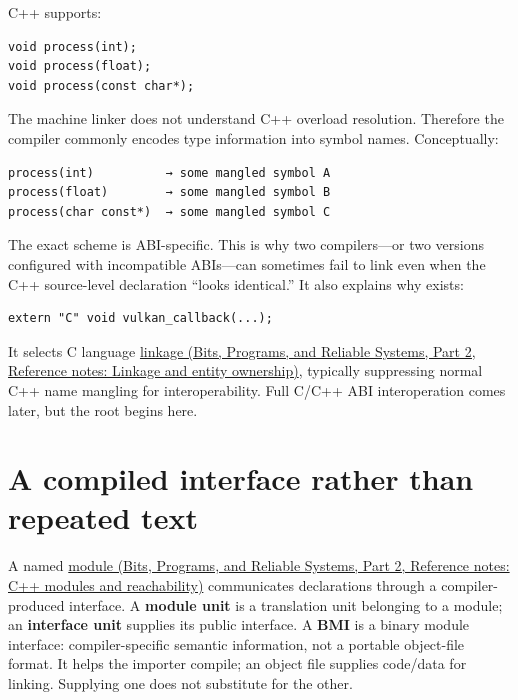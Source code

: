 C++ supports:

\begin{verbatim}
void process(int);
void process(float);
void process(const char*);
\end{verbatim}

The machine linker does not understand C++ overload resolution. Therefore the compiler commonly encodes type information into symbol names. Conceptually:

\begin{verbatim}
process(int)          → some mangled symbol A
process(float)        → some mangled symbol B
process(char const*)  → some mangled symbol C
\end{verbatim}

The exact scheme is ABI-specific. This is why two compilers---or two versions configured with incompatible ABIs---can sometimes fail to link even when the C++ source-level declaration ``looks identical.'' It also explains why  exists:

\begin{verbatim}
extern "C" void vulkan_callback(...);
\end{verbatim}

It selects C language \href{../01-Bits-Programs-and-Reliable-Systems-P02/main.pdf\#nameddest=appendix-74a0ec818c18}{linkage (Bits, Programs, and Reliable Systems, Part 2, Reference notes: Linkage and entity ownership)}, typically suppressing normal C++ name mangling for interoperability. Full C/C++ ABI interoperation comes later, but the root begins here.

\section{A compiled interface rather than repeated text}\label{05-engine-i-ch002-a-compiled-interface-rather-than-repeated-text}

\hypertarget{05-engine-i-ch002-a-compiled-interface-rather-than-repeated-text}{}

A named \href{../01-Bits-Programs-and-Reliable-Systems-P02/main.pdf\#nameddest=appendix-410a611a5b8d}{module (Bits, Programs, and Reliable Systems, Part 2, Reference notes: C++ modules and reachability)} communicates declarations through a compiler-produced interface. A \textbf{module unit} is a translation unit belonging to a module; an \textbf{interface unit} supplies its public interface. A \textbf{BMI} is a binary module interface: compiler-specific semantic information, not a portable object-file format. It helps the importer compile; an object file supplies code/data for linking. Supplying one does not substitute for the other.

